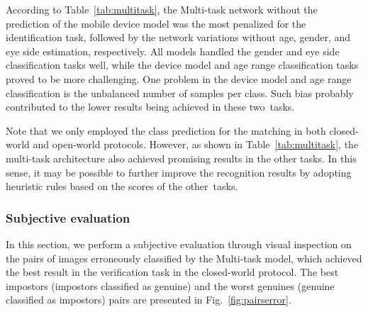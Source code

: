 According to Table~\ref{tab:multitask}, the Multi-task network without the prediction of the mobile device model was the most penalized for the identification task, followed by the network variations without age, gender, and eye side estimation, respectively.
All models handled the gender and eye side classification tasks well, while the device model and age range classification tasks proved to be more challenging.
One problem in the device model and age range classification is the unbalanced number of samples per class.
Such bias probably contributed to the lower results being achieved in these two~tasks.

Note that we only employed the class prediction for the matching in both closed-world and open-world protocols.
However, as shown in Table~\ref{tab:multitask}, the multi-task architecture also achieved promising results in the other tasks.
In this sense, it may be possible to further improve the recognition results by adopting heuristic rules based on the scores of the other~tasks.

\subsubsection{Subjective evaluation}
\label{sec:subjective}

In this section, we perform a subjective evaluation through visual inspection on the pairs of images erroneously classified by the Multi-task model, which achieved the best result in the verification task in the closed-world protocol.
The best impostors (impostors classified as genuine) and the worst genuines (genuine classified as impostors) pairs are presented in Fig.~\ref{fig:pairserror}.

